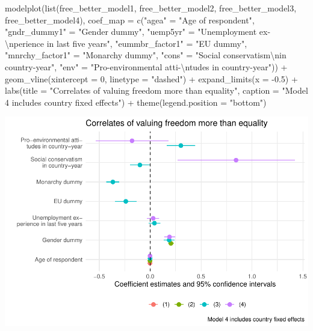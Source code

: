\documentclass[
]{article}
\newenvironment{Shaded}{\begin{snugshade}}{\end{snugshade}}
\newcommand{\AttributeTok}[1]{\textcolor[rgb]{0.77,0.63,0.00}{#1}}
\newcommand{\DecValTok}[1]{\textcolor[rgb]{0.00,0.00,0.81}{#1}}
\newcommand{\FloatTok}[1]{\textcolor[rgb]{0.00,0.00,0.81}{#1}}
\newcommand{\FunctionTok}[1]{\textcolor[rgb]{0.00,0.00,0.00}{#1}}
\newcommand{\NormalTok}[1]{#1}
\newcommand{\OtherTok}[1]{\textcolor[rgb]{0.56,0.35,0.01}{#1}}
\newcommand{\SpecialCharTok}[1]{\textcolor[rgb]{0.00,0.00,0.00}{#1}}
\newcommand{\StringTok}[1]{\textcolor[rgb]{0.31,0.60,0.02}{#1}}
\begin{document}
\begin{Shaded}
\begin{Highlighting}[]
\FunctionTok{modelplot}\NormalTok{(}\FunctionTok{list}\NormalTok{(free\_better\_model1, free\_better\_model2, }
\NormalTok{               free\_better\_model3, free\_better\_model4),}
               \AttributeTok{coef\_map =} \FunctionTok{c}\NormalTok{(}\StringTok{"agea"} \OtherTok{=} \StringTok{"Age of respondent"}\NormalTok{,}
                            \StringTok{"gndr\_dummy1"} \OtherTok{=} \StringTok{"Gender dummy"}\NormalTok{, }
                            \StringTok{"uemp5yr"} \OtherTok{=} \StringTok{"Unemployment ex{-}}\SpecialCharTok{\textbackslash{}n}\StringTok{perience in last five years"}\NormalTok{,}
                            \StringTok{"eummbr\_factor1"} \OtherTok{=} \StringTok{"EU dummy"}\NormalTok{, }
                            \StringTok{"mnrchy\_factor1"} \OtherTok{=} \StringTok{"Monarchy dummy"}\NormalTok{,}
                            \StringTok{"cons"} \OtherTok{=} \StringTok{"Social conservatism}\SpecialCharTok{\textbackslash{}n}\StringTok{in country{-}year"}\NormalTok{, }
                            \StringTok{"env"} \OtherTok{=} \StringTok{"Pro{-}environmental atti{-}}\SpecialCharTok{\textbackslash{}n}\StringTok{tudes in country{-}year"}\NormalTok{)) }\SpecialCharTok{+}
  \FunctionTok{geom\_vline}\NormalTok{(}\AttributeTok{xintercept =} \DecValTok{0}\NormalTok{, }\AttributeTok{linetype =} \StringTok{"dashed"}\NormalTok{) }\SpecialCharTok{+}
  \FunctionTok{expand\_limits}\NormalTok{(}\AttributeTok{x =} \SpecialCharTok{{-}}\FloatTok{0.5}\NormalTok{) }\SpecialCharTok{+}
  \FunctionTok{labs}\NormalTok{(}\AttributeTok{title =} \StringTok{"Correlates of valuing freedom more than equality"}\NormalTok{, }
       \AttributeTok{caption =} \StringTok{"Model 4 includes country fixed effects"}\NormalTok{) }\SpecialCharTok{+}
  \FunctionTok{theme}\NormalTok{(}\AttributeTok{legend.position =} \StringTok{"bottom"}\NormalTok{)}
\end{Highlighting}
\end{Shaded}

\includegraphics{AVCD-Assignment3-Edenhofer_files/figure-latex/free-better-correlates-1.pdf}
\end{document}
